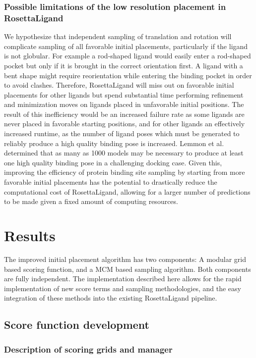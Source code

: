 \subsubsection{Possible limitations of the low resolution placement in RosettaLigand}
We hypothesize that independent sampling of translation and rotation will complicate sampling of all favorable initial placements, particularly if the ligand is not globular.
For example a rod-shaped ligand would easily enter a rod-shaped pocket but only if it is brought in the correct orientation first.
A ligand with a bent shape might require reorientation while entering the binding pocket in order to avoid clashes.
Therefore, RosettaLigand will miss out on favorable initial placements for other ligands but spend substantial time performing refinement and minimization moves on ligands placed in unfavorable initial positions.
The result of this inefficiency would be an increased failure rate as some ligands are never placed in favorable starting positions, and for other ligands an effectively increased runtime, as the number of ligand poses which must be generated to reliably produce a high quality binding pose is increased.
Lemmon et al.\citep{Lemmon:2013jd} determined that as many as 1000 models may be necessary to produce at least one high quality binding pose in a challenging docking case.
Given this, improving the efficiency of protein binding site sampling by starting from more favorable initial placements has the potential to drastically reduce the computational cost of RosettaLigand, allowing for a larger number of predictions to be made given a fixed amount of computing resources.

\section{Results}

The improved initial placement algorithm has two components: A modular grid based scoring function, and a MCM based sampling algorithm.
Both components are fully independent.
The implementation described here allows for the rapid implementation of new score terms and sampling methodologies, and the easy integration of these methods into the existing RosettaLigand pipeline.

\subsection{Score function development}
\subsubsection{Description of scoring grids and manager}

